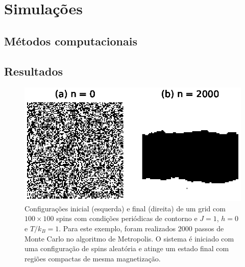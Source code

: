 \section{Simulações}

\subsection{Métodos computacionais}

\lipsum[2-4]

\subsection{Resultados}

\begin{figure}[ht]
	\centering
	\includegraphics[scale = 1]{./img/evolucao-grid-100x100}
    \caption{Configurações inicial (esquerda) e final (direita) de um grid com $100 \times 100$ spins com condições periódicas de contorno e $J = 1$, $h = 0$ e $T/k_B = 1$. Para este exemplo, foram realizados $2000$ passos de Monte Carlo no algoritmo de Metropolis. O sistema é iniciado com uma configuração de spins aleatória e atinge um estado final com regiões compactas de mesma magnetização.}
    \label{fig:evolucao-grid-100x100}
\end{figure}

